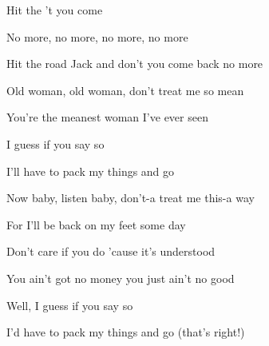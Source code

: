 
\zr
Hit the   't you come 

No more, no more, no more, no more

Hit the road Jack and don't you come back no more

\kr
\zs

Old woman, old woman, don't treat me so mean

You're the meanest woman I've ever seen

I guess if you say so

I'll have to pack my things and go

\ks

\zr
\kr

\zs

Now baby, listen baby, don't-a treat me this-a way

For I'll be back on my feet some day

Don't care if you do 'cause it's understood

You ain't got no money you just ain't no good


Well, I guess if you say so

I'd have to pack my things and go (that's right!)

\ks

\zr
\kr

\zr
\kr

\kp


